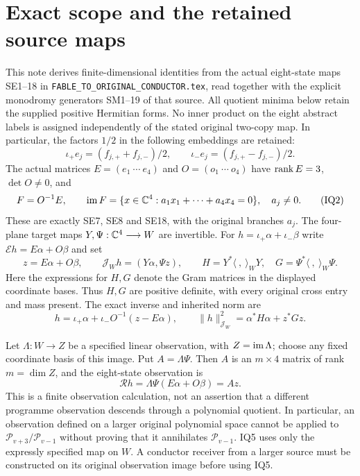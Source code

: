 \section{Exact scope and the retained source maps}
This note derives finite-dimensional identities from the actual eight-state
maps SE1--18 in \texttt{FABLE\_TO\_ORIGINAL\_CONDUCTOR.tex}, read together
with the explicit monodromy generators SM1--19 of that source.  All quotient
minima below retain the supplied positive Hermitian forms.  No inner product
on the eight abstract labels is assigned independently of the stated original
two-copy map.  In particular, the factors $1/2$ in the following embeddings
are retained:
\[
 \iota_+e_j=(f_{j,+}+f_{j,-})/2,\qquad
 \iota_-e_j=(f_{j,+}-f_{j,-})/2.                       \tag{IQ1}
\]
The actual matrices $E=(e_1\ \cdots\ e_4)$ and $O=(o_1\ \cdots\ o_4)$
have $\operatorname{rank} E=3$, $\det O\ne0$, and
\[
 F=O^{-1}E,\qquad
 \operatorname{im} F=\{x\in\mathbb C^4:a_1x_1+\cdots+a_4x_4=0\},\quad a_j\ne0. \tag{IQ2}
\]
These are exactly SE7, SE8 and SE18, with the original branches $a_j$.
The four-plane target maps $Y,\Psi:\mathbb C^4\longrightarrow W$ are invertible.
For $h=\iota_+\alpha+\iota_-\beta$ write
$\mathcal E h=E\alpha+O\beta$ and set
\[
 z=E\alpha+O\beta,\qquad
 \mathcal J_W h=(Y\alpha,\Psi z),\qquad
 H=Y^*\langle\ ,\ \rangle_WY,\quad
 G=\Psi^*\langle\ ,\ \rangle_W\Psi.                  \tag{IQ3}
\]
Here the expressions for $H,G$ denote the Gram matrices in the displayed
coordinate bases.  Thus $H,G$ are positive definite, with every original
cross entry and mass present.  The exact inverse and inherited norm are
\[
 h=\iota_+\alpha+\iota_-O^{-1}(z-E\alpha),\qquad
 \|h\|_{\mathcal J_W}^2=\alpha^*H\alpha+z^*Gz.         \tag{IQ4}
\]

Let $\Lambda:W\to Z$ be a specified linear observation, with $Z=\operatorname{im}\Lambda$;
choose any fixed coordinate basis of this image.  Put $A=\Lambda\Psi$.
Then $A$ is an $m\times4$ matrix of rank $m=\dim Z$, and the eight-state
observation is
\[
 \mathcal R h=\Lambda\Psi(E\alpha+O\beta)=Az.          \tag{IQ5}
\]
This is a finite observation calculation, not an assertion that a different
programme observation descends through a polynomial quotient.  In particular,
an observation defined on a larger original polynomial space cannot be applied
to $\mathcal P_{v+3}/\mathcal P_{v-1}$ without proving that it annihilates
$\mathcal P_{v-1}$.  IQ5 uses only the expressly specified map on $W$.  A
conductor receiver from a larger source must be constructed on its original
observation image before using IQ5.

